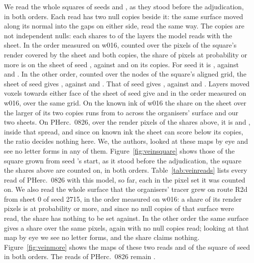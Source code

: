 We read the whole squares of seeds \RcOneSeedId{} and \RcTwoSeedId{}, as they stood before the adjudication, in both
orders. Each read has two null copies beside it: the same surface moved along its normal into the gaps on either side,
read the same way. The copies are not independent nulls: each shares \VeinNullSharedMin{} to \VeinNullSharedMax{} of
the \VeinNullLayers{} layers the model reads with the sheet. In the order measured on w016, counted over the pixels of
the square's render covered by the sheet and both copies, the share of pixels at probability \VeinThreshold{} or more is
\VeinSixSheet{} on the sheet of seed \RcOneSeedId{}, against \VeinSixPlus{} and \VeinSixMinus{} on its copies. For seed
\RcTwoSeedId{} it is \VeinFiveSheet{}, against \VeinFivePlus{} and \VeinFiveMinus{}. In the other order, counted over the nodes of the square's aligned grid, the sheet of seed
\RcOneSeedId{} gives \VeinSixSheetOther{}, against \VeinSixPlusOther{} and \VeinSixMinusOther{}. That of seed
\RcTwoSeedId{} gives \VeinFiveSheetOther{}, against \VeinFivePlusOther{} and \VeinFiveMinusOther{}. Layers moved
\VeinFaceOffset{} voxels towards either face of the sheet of seed \RcOneSeedId{} give \VeinFacePlus{} and
\VeinFaceMinus{} in the order measured on w016, over the same grid. On the known ink of w016 the share on the sheet over the larger of its
two copies runs from \VeinRatioMin{} to \VeinRatioMax{} across the organisers' surface and our two sheets. On
PHerc.~0826, over the render pixels of the shares above, it is \VeinRatioSix{} and \VeinRatioFive{}, inside that spread, and since on known ink the sheet can score
below its copies, the ratio decides nothing here. We, the authors, looked at these maps by eye and see no letter forms in any of them.
Figure~\ref{fig:veinsquare} shows those of the square grown from seed \RcOneSeedId{}'s start, as it stood before the
adjudication, the square the shares above are counted on, in both orders. Table~\ref{tab:veinreads} lists every read
of PHerc.~0826 with this model, \VeinReadsCount{} so far, each in the pixel set it was counted on. We also read the whole
surface that the organisers' tracer grew on route R2d from sheet 0 of seed 2715, in the order measured on w016: a share
\VeinRdShare{} of its \VeinRdPixels{} render pixels is at probability \VeinThreshold{} or more, and since no null
copies of that surface were read, the share has nothing to be set against. In the other order the same surface gives a share
\VeinRdShareOther{} over the same pixels, again with no null copies read; looking at that map by eye we see no letter
forms, and the share claims nothing. Figure~\ref{fig:veinmore} shows the maps of these two reads and of the square of seed
\RcTwoSeedId{} in both orders. The reads of PHerc.~0826 remain
\PcInkReading{}.

